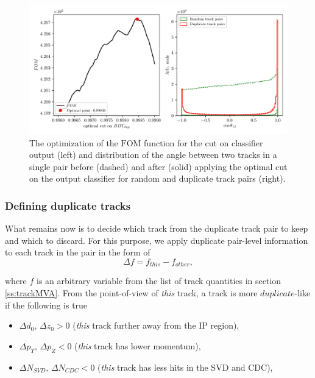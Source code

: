 \begin{figure}[H]
	\centering
	\captionsetup{width=0.8\linewidth}
	\includegraphics[width=\linewidth]{fig/ROECleanup_dup_opt}
	\caption{The optimization of the $\mathrm{FOM}$ function for the cut on classifier output (left) and distribution of the angle between two tracks in a single pair before (dashed) and after (solid) applying the optimal cut on the output classifier for random and duplicate track pairs (right).}
	\label{fig:ROE_dupOpt}
\end{figure}

\subsubsection{Defining duplicate tracks}

What remains now is to decide which track from the duplicate track pair to keep and which to discard. For this purpose, we apply duplicate pair-level information to each track in the pair in the form of
\begin{equation}
\Delta f = f_{this} - f_{other},
\end{equation}

where $f$ is an arbitrary variable from the list of track quantities in section \ref{ss:trackMVA}. From the point-of-view of \textit{this} track, a track is more $duplicate$-like if the following is true
\begin{itemize}
	\item $\Delta d_0,\,\Delta z_0 > 0$ (\textit{this} track further away from the IP region),
	\item $\Delta p_T,\,\Delta p_Z < 0$ (\textit{this} track has lower momentum),
	\item $\Delta N_{SVD},\,\Delta N_{CDC} < 0$ (\textit{this} track has less hits in the SVD and CDC),
\end{itemize}

